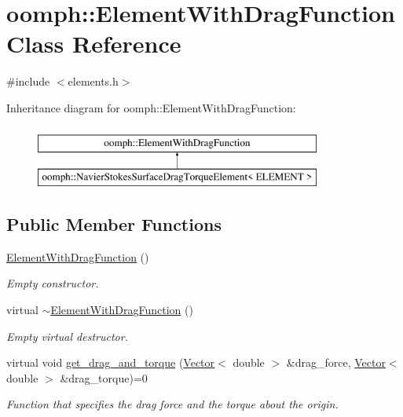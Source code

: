 \hypertarget{classoomph_1_1ElementWithDragFunction}{}\section{oomph\+:\+:Element\+With\+Drag\+Function Class Reference}
\label{classoomph_1_1ElementWithDragFunction}


{\ttfamily \#include $<$elements.\+h$>$}

Inheritance diagram for oomph\+:\+:Element\+With\+Drag\+Function\+:\begin{figure}[H]
\begin{center}
\leavevmode
\includegraphics[height=2.000000cm]{classoomph_1_1ElementWithDragFunction}
\end{center}
\end{figure}
\subsection*{Public Member Functions}
\begin{DoxyCompactItemize}
\item 
\hyperlink{classoomph_1_1ElementWithDragFunction_aff661f6ae5361aac6de44519298c9bc0}{Element\+With\+Drag\+Function} ()
\begin{DoxyCompactList}\small\item\em Empty constructor. \end{DoxyCompactList}\item 
virtual \hyperlink{classoomph_1_1ElementWithDragFunction_a8ee7ce8b20bff27133c746d03f24924d}{$\sim$\+Element\+With\+Drag\+Function} ()
\begin{DoxyCompactList}\small\item\em Empty virtual destructor. \end{DoxyCompactList}\item 
virtual void \hyperlink{classoomph_1_1ElementWithDragFunction_a25eba94e85107e4361476861af2ef274}{get\+\_\+drag\+\_\+and\+\_\+torque} (\hyperlink{classoomph_1_1Vector}{Vector}$<$ double $>$ \&drag\+\_\+force, \hyperlink{classoomph_1_1Vector}{Vector}$<$ double $>$ \&drag\+\_\+torque)=0
\begin{DoxyCompactList}\small\item\em Function that specifies the drag force and the torque about the origin. \end{DoxyCompactList}\end{DoxyCompactItemize}


